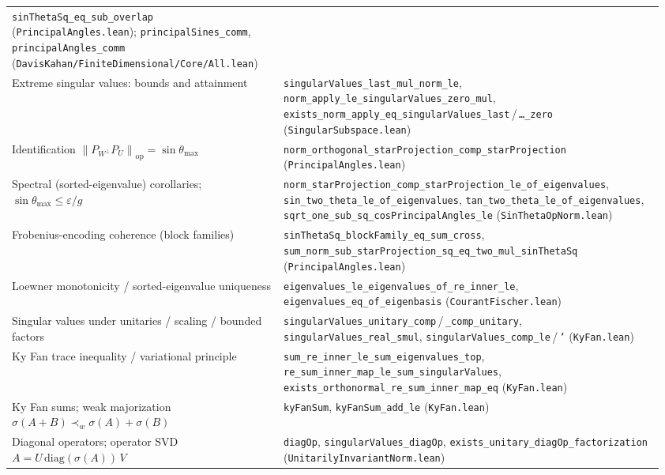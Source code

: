 \documentclass[11pt]{article}
\newcommand{\norm}[1]{\left\lVert #1\right\rVert}
\newcommand{\eps}{\varepsilon}
\newcommand{\op}{\mathrm{op}}
\newcommand{\gap}{g}
\theoremstyle{remark}
\begin{document}
\begin{center}
\begin{tabular}{@{}p{0.40\linewidth}p{0.56\linewidth}@{}}
    \texttt{sinThetaSq\_eq\_sub\_overlap}
    (\texttt{PrincipalAngles.lean});
    \texttt{principalSines\_comm}, \texttt{principalAngles\_comm}
    (\texttt{DavisKahan/FiniteDimensional/Core/All.lean}) \\
Extreme singular values: bounds and attainment
  & \texttt{singularValues\_last\_mul\_norm\_le},
    \texttt{norm\_apply\_le\_singularValues\_zero\_mul},
    \texttt{exists\_norm\_apply\_eq\_singularValues\_last}\,/\,\texttt{\dots\_zero}
    (\texttt{SingularSubspace.lean}) \\
Identification $\norm{P_{W^{\perp}}P_U}_{\op}=\sin\theta_{\max}$
  & \texttt{norm\_orthogonal\_starProjection\_comp\_starProjection}
    (\texttt{PrincipalAngles.lean}) \\
Spectral (sorted-eigenvalue) corollaries; $\sin\theta_{\max}\le\eps/\gap$
  & \texttt{norm\_starProjection\_comp\_starProjection\_le\_of\_eigenvalues},
    \texttt{sin\_two\_theta\_le\_of\_eigenvalues},
    \texttt{tan\_two\_theta\_le\_of\_eigenvalues},
    \texttt{sqrt\_one\_sub\_sq\_cosPrincipalAngles\_le}
    (\texttt{SinThetaOpNorm.lean}) \\
Frobenius-encoding coherence (block families)
  & \texttt{sinThetaSq\_blockFamily\_eq\_sum\_cross},
    \texttt{sum\_norm\_sub\_starProjection\_sq\_eq\_two\_mul\_sinThetaSq}
    (\texttt{PrincipalAngles.lean}) \\
Loewner monotonicity / sorted-eigenvalue uniqueness
  & \texttt{eigenvalues\_le\_eigenvalues\_of\_re\_inner\_le},
    \texttt{eigenvalues\_eq\_of\_eigenbasis} (\texttt{CourantFischer.lean}) \\
Singular values under unitaries / scaling / bounded factors
  & \texttt{singularValues\_unitary\_comp}\,/\,\texttt{\_comp\_unitary},
    \texttt{singularValues\_real\_smul},
    \texttt{singularValues\_comp\_le}\,/\,\texttt{'} (\texttt{KyFan.lean}) \\
Ky Fan trace inequality / variational principle
  & \texttt{sum\_re\_inner\_le\_sum\_eigenvalues\_top},
    \texttt{re\_sum\_inner\_map\_le\_sum\_singularValues},
    \texttt{exists\_orthonormal\_re\_sum\_inner\_map\_eq} (\texttt{KyFan.lean}) \\
Ky Fan sums; weak majorization $\sigma(A+B)\prec_w\sigma(A)+\sigma(B)$
  & \texttt{kyFanSum}, \texttt{kyFanSum\_add\_le} (\texttt{KyFan.lean}) \\
Diagonal operators; operator SVD $A=U\,\mathrm{diag}(\sigma(A))\,V$
  & \texttt{diagOp}, \texttt{singularValues\_diagOp},
    \texttt{exists\_unitary\_diagOp\_factorization}
    (\texttt{UnitarilyInvariantNorm.lean}) \\

\end{tabular}
\end{center}
\end{document}
